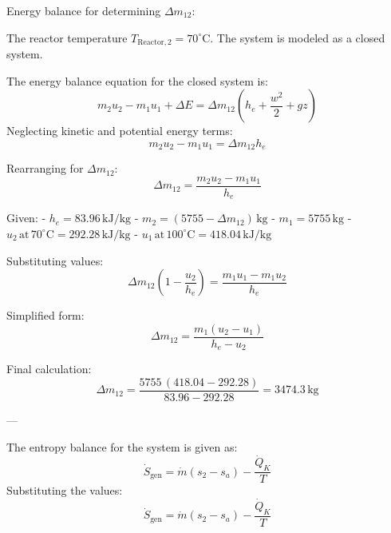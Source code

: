 Energy balance for determining \( \Delta m_{12} \):  

The reactor temperature \( T_{\text{Reactor},2} = 70^\circ\text{C} \).  
The system is modeled as a closed system.  

The energy balance equation for the closed system is:  
\[
m_2 u_2 - m_1 u_1 + \Delta E = \Delta m_{12} \left( h_e + \frac{w^2}{2} + g z \right)
\]  
Neglecting kinetic and potential energy terms:  
\[
m_2 u_2 - m_1 u_1 = \Delta m_{12} h_e
\]  

Rearranging for \( \Delta m_{12} \):  
\[
\Delta m_{12} = \frac{m_2 u_2 - m_1 u_1}{h_e}
\]  

Given:  
- \( h_e = 83.96 \, \text{kJ/kg} \)  
- \( m_2 = (5755 - \Delta m_{12}) \, \text{kg} \)  
- \( m_1 = 5755 \, \text{kg} \)  
- \( u_2 \, \text{at} \, 70^\circ\text{C} = 292.28 \, \text{kJ/kg} \)  
- \( u_1 \, \text{at} \, 100^\circ\text{C} = 418.04 \, \text{kJ/kg} \)  

Substituting values:  
\[
\Delta m_{12} \left( 1 - \frac{u_2}{h_e} \right) = \frac{m_1 u_1 - m_1 u_2}{h_e}
\]  

Simplified form:  
\[
\Delta m_{12} = \frac{m_1 (u_2 - u_1)}{h_e - u_2}
\]  

Final calculation:  
\[
\Delta m_{12} = \frac{5755 \, (418.04 - 292.28)}{83.96 - 292.28} = 3474.3 \, \text{kg}
\]  

---

The entropy balance for the system is given as:  
\[
\dot{S}_{\text{gen}} = \dot{m} \left( s_2 - s_a \right) - \frac{\dot{Q}_K}{T}
\]  
Substituting the values:  
\[
\dot{S}_{\text{gen}} = \dot{m} \left( s_2 - s_a \right) - \frac{\dot{Q}_K}{T}
\]